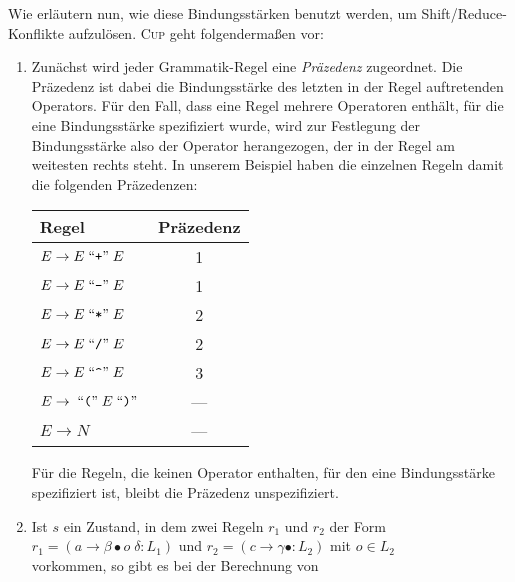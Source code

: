 Wie erl\"autern nun, wie diese Bindungsst\"arken benutzt werden, um Shift/Reduce-Konflikte aufzul\"osen.
\textsc{Cup} geht folgenderma{\ss}en vor:
\begin{enumerate}
\item Zun\"achst wird jeder Grammatik-Regel eine \emph{Pr\"azedenz} zugeordnet.
      Die Pr\"azedenz ist dabei die Bindungsst\"arke des letzten in der Regel auftretenden Operators.
      F\"ur den Fall, dass eine Regel mehrere Operatoren enth\"alt, f\"ur die eine Bindungsst\"arke spezifiziert
      wurde, wird zur Festlegung der Bindungsst\"arke also der Operator herangezogen, der in
      der Regel am weitesten 
      rechts steht.  In unserem Beispiel haben die einzelnen Regeln damit die folgenden Pr\"azedenzen:
      \begin{center}
        \begin{tabular}[t]{|l|c|}
          \hline
          Regel                          & Pr\"azedenz  \\
          \hline
          \hline
          $E \rightarrow E \;\mbox{``\texttt{+}''}\; E$ & 1          \\
          \hline
          $E \rightarrow E \;\mbox{``\texttt{-}''}\; E$ & 1          \\
          \hline
          $E \rightarrow E \;\mbox{``\texttt{*}''}\; E$ & 2          \\
          \hline
          $E \rightarrow E \;\mbox{``\texttt{/}''}\; E$ & 2          \\
          \hline
          $E \rightarrow E \quoted{\symbol{94}} E$ & 3 \\
          \hline
          $E \rightarrow \;\mbox{``\texttt{(}''}\; E \;\mbox{``\texttt{)}''}\;$ & --- \\
          \hline
          $E \rightarrow N$ & --- \\
          \hline
        \end{tabular}
      \end{center}
      F\"ur die Regeln, die keinen Operator enthalten, f\"ur den eine Bindungsst\"arke spezifiziert ist,
      bleibt die Pr\"azedenz unspezifiziert.
\item Ist $s$ ein Zustand, in dem zwei Regeln $r_1$ und $r_2$ der Form
      \\[0.2cm]
      \hspace*{1.3cm}
      $r_1 = (a \rightarrow \beta \bullet o \;\delta:L_1)$ \quad und \quad
      $r_2 = (c \rightarrow \gamma \bullet : L_2)$ \quad mit \quad $o \in L_2$
      \\[0.2cm]
      vorkommen, so gibt es bei der Berechnung von 
      \\[0.2cm]

\end{enumerate}
